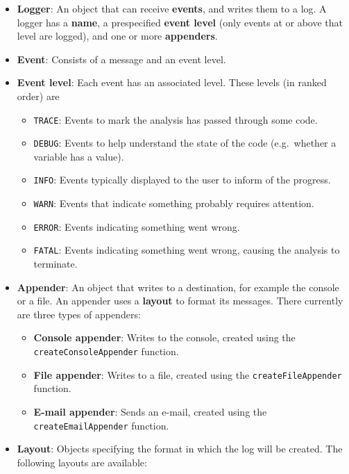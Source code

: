 \documentclass[]{article}
\providecommand{\tightlist}{%
  \setlength{\itemsep}{0pt}\setlength{\parskip}{0pt}}
\begin{document}
\begin{itemize}
\tightlist
\item
  \textbf{Logger}: An object that can receive \textbf{events}, and
  writes them to a log. A logger has a \textbf{name}, a prespecified
  \textbf{event level} (only events at or above that level are logged),
  and one or more \textbf{appenders}.
\item
  \textbf{Event}: Consists of a message and an event level.
\item
  \textbf{Event level}: Each event has an associated level. These levels
  (in ranked order) are

  \begin{itemize}
  \tightlist
  \item
    \texttt{TRACE}: Events to mark the analysis has passed through some
    code.
  \item
    \texttt{DEBUG}: Events to help understand the state of the code
    (e.g.~whether a variable has a value).
  \item
    \texttt{INFO}: Events typically displayed to the user to inform of
    the progress.
  \item
    \texttt{WARN}: Events that indicate something probably requires
    attention.
  \item
    \texttt{ERROR}: Events indicating something went wrong.
  \item
    \texttt{FATAL}: Events indicating something went wrong, causing the
    analysis to terminate.
  \end{itemize}
\item
  \textbf{Appender}: An object that writes to a destination, for example
  the console or a file. An appender uses a \textbf{layout} to format
  its messages. There currently are three types of appenders:

  \begin{itemize}
  \tightlist
  \item
    \textbf{Console appender}: Writes to the console, created using the
    \texttt{createConsoleAppender} function.
  \item
    \textbf{File appender}: Writes to a file, created using the
    \texttt{createFileAppender} function.
  \item
    \textbf{E-mail appender}: Sends an e-mail, created using the
    \texttt{createEmailAppender} function.
  \end{itemize}
\item
  \textbf{Layout}: Objects specifying the format in which the log will
  be created. The following layouts are available:


\end{itemize}
\end{document}
